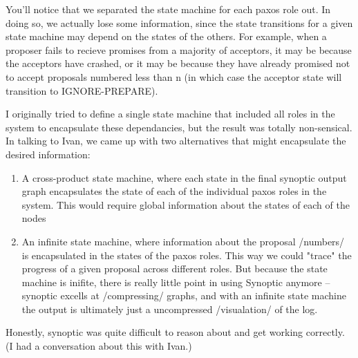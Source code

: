 \documentclass[12pt]{article}
\begin{document}
You'll notice that we separated the state machine for each paxos role out. In
doing so, we actually lose some information, since the state transitions for
a given state machine may depend on the states of the others. For example,
when a proposer fails to recieve promises from a majority of acceptors, it may be because
the acceptors have crashed, or it may be because they have already promised
not to accept proposals numbered less than n (in which case the acceptor state
will transition to IGNORE-PREPARE).

I originally tried to define a single state machine that included all roles in
the system to encapsulate these dependancies, but the result was totally non-sensical. In talking to Ivan, we
came up with two alternatives that might encapsulate the desired information:

\begin{enumerate}
\item A cross-product state machine, where each state in the final synoptic
output graph encapsulates the state of each of the individual paxos roles in
the system. This would require global information about the states of each of the nodes
\item An infinite state machine, where information about the proposal
/numbers/ is encapsulated in the states of the paxos roles. This way we could
"trace" the progress of a given proposal across different roles. But because
the state machine is inifite, there is really little point in using Synoptic
anymore -- synoptic excells at /compressing/ graphs, and with an infinite
state machine the output is ultimately just a uncompressed /visualation/ of the log.
\end{enumerate}

Honestly, synoptic was quite difficult to reason about and get working
correctly. (I had a conversation about
this with Ivan.)
\end{document}
